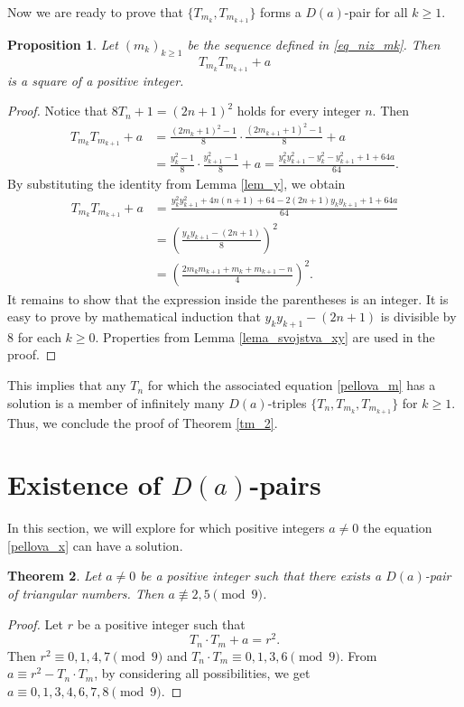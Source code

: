 \documentclass[12pt]{amsart}
\newtheorem{theorem}{Theorem}
\newtheorem{proposition}[theorem]{Proposition}
\theoremstyle{definition}
\begin{document}
Now we are ready to prove that $\{T_{m_k},T_{m_{k+1}}\}$ forms a $D(a)$-pair for all $k\geq 1$. 

\begin{proposition}
    Let $(m_k)_{k\geq 1}$ be the sequence defined in \eqref{eq_niz_mk}. Then 
    $$T_{m_k}T_{m_{k+1}}+a$$
    is a square of a positive integer. 
\end{proposition}
\begin{proof}
    Notice that $8T_n+1=(2n+1)^2$ holds for every integer $n$. Then 
    \begin{align*}
        T_{m_k}T_{m_{k+1}}+a&=\frac{(2m_k+1)^2-1}{8}\cdot\frac{(2m_{k+1}+1)^2-1}{8} +a\\
        &=\frac{y_k^2-1}{8}\cdot\frac{y_{k+1}^2-1}{8} +a=\frac{y_k^2y_{k+1}^2-y_k^2-y_{k+1}^2+1+64a}{64}.
    \end{align*}
    By substituting the identity from Lemma \ref{lem_y}, we obtain
    \begin{align*}
        T_{m_k}T_{m_{k+1}}+a
        &=\frac{y_k^2y_{k+1}^2+4n(n+1)+64-2(2n+1)y_ky_{k+1}+1+64a}{64}\\
        &=\left(\frac{y_ky_{k+1}-(2n+1)}{8}\right)^2\\
        &=\left(\frac{2m_km_{k+1}+m_k+m_{k+1}-n}{4}\right)^2.
    \end{align*}
    It remains to show that the expression inside the parentheses is an integer. It is easy to prove by mathematical induction that $y_ky_{k+1}-(2n+1)$ is divisible by $8$ for each $k\geq 0$. Properties from Lemma \ref{lema_svojstva_xy} are used in the proof. 
\end{proof}

This implies that any $T_n$ for which the associated equation \eqref{pellova_m} has a solution is a member of infinitely many $D(a)$-triples $\{T_n,T_{m_k},T_{m_{k+1}}\}$ for $k\geq 1$. Thus, we conclude the proof of Theorem \ref{tm_2}.


\section{Existence of $D(a)$-pairs}\label{section:ex_pairs}

In this section, we will explore for which positive integers $a\neq 0$ the equation \eqref{pellova_x} can have a solution. 

\begin{theorem}\label{thm:modular_9}
Let $a\neq 0$ be a positive integer such that there exists a $D(a)$-pair of triangular numbers. Then $a \not\equiv 2, 5 \pmod 9$.
\end{theorem}
\begin{proof}
    Let $r$ be a positive integer such that
    $$T_n\cdot T_m+a=r^2.$$
    Then $r^2\equiv 0,1,4,7\pmod 9$ and $T_n\cdot T_m\equiv 0,1,3,6\pmod 9$. From $a\equiv r^2- T_n\cdot T_m$, by considering all possibilities, we get 
    $a\equiv 0,1,3,4,6,7,8\pmod 9.$
\end{proof}
\end{document}
